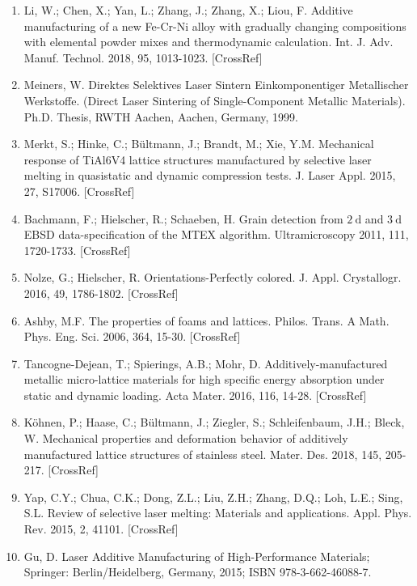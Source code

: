 \documentclass[10pt]{article}
\begin{document}
\begin{enumerate}
  \item Li, W.; Chen, X.; Yan, L.; Zhang, J.; Zhang, X.; Liou, F. Additive manufacturing of a new Fe-Cr-Ni alloy with gradually changing compositions with elemental powder mixes and thermodynamic calculation. Int. J. Adv. Manuf. Technol. 2018, 95, 1013-1023. [CrossRef]

  \item Meiners, W. Direktes Selektives Laser Sintern Einkomponentiger Metallischer Werkstoffe. (Direct Laser Sintering of Single-Component Metallic Materials). Ph.D. Thesis, RWTH Aachen, Aachen, Germany, 1999.

  \item Merkt, S.; Hinke, C.; Bültmann, J.; Brandt, M.; Xie, Y.M. Mechanical response of TiAl6V4 lattice structures manufactured by selective laser melting in quasistatic and dynamic compression tests. J. Laser Appl. 2015, 27, S17006. [CrossRef]

  \item Bachmann, F.; Hielscher, R.; Schaeben, H. Grain detection from $2 \mathrm{~d}$ and $3 \mathrm{~d}$ EBSD data-specification of the MTEX algorithm. Ultramicroscopy 2011, 111, 1720-1733. [CrossRef]

  \item Nolze, G.; Hielscher, R. Orientations-Perfectly colored. J. Appl. Crystallogr. 2016, 49, 1786-1802. [CrossRef]

  \item Ashby, M.F. The properties of foams and lattices. Philos. Trans. A Math. Phys. Eng. Sci. 2006, 364, 15-30. [CrossRef]

  \item Tancogne-Dejean, T.; Spierings, A.B.; Mohr, D. Additively-manufactured metallic micro-lattice materials for high specific energy absorption under static and dynamic loading. Acta Mater. 2016, 116, 14-28. [CrossRef]

  \item Köhnen, P.; Haase, C.; Bültmann, J.; Ziegler, S.; Schleifenbaum, J.H.; Bleck, W. Mechanical properties and deformation behavior of additively manufactured lattice structures of stainless steel. Mater. Des. 2018, 145, 205-217. [CrossRef]

  \item Yap, C.Y.; Chua, C.K.; Dong, Z.L.; Liu, Z.H.; Zhang, D.Q.; Loh, L.E.; Sing, S.L. Review of selective laser melting: Materials and applications. Appl. Phys. Rev. 2015, 2, 41101. [CrossRef]

  \item Gu, D. Laser Additive Manufacturing of High-Performance Materials; Springer: Berlin/Heidelberg, Germany, 2015; ISBN 978-3-662-46088-7.


\end{enumerate}
\end{document}
